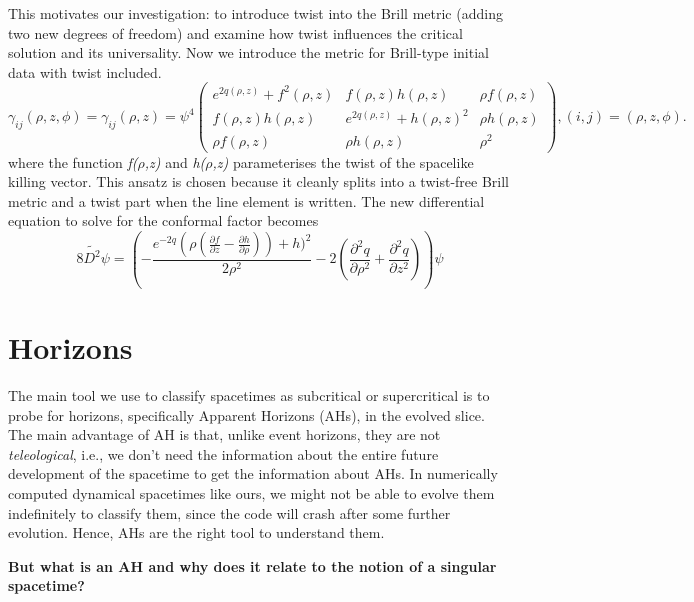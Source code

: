 This motivates our investigation: to introduce twist into the Brill metric (adding two new
degrees of freedom) and examine how twist influences the critical solution and its 
universality.
Now we introduce the metric for Brill-type initial data with twist included.
\begin{equation}
\gamma_{ij}(\rho,z,\phi) = \gamma_{ij}(\rho,z) = 
\psi ^4\begin{pmatrix}
    e^{2q(\rho,z)} + f^2(\rho,z) & f(\rho,z)h(\rho,z) & \rho f(\rho,z) \\
    f(\rho,z)h(\rho,z) & e^{2q(\rho,z)} + h(\rho,z)^2 & \rho h(\rho,z) \\
    \rho f(\rho,z) & \rho h(\rho,z) & \rho^{2}
\end{pmatrix},
(i,j) = (\rho, z, \phi).
\label{Twist-included}
\end{equation}
where the function \emph{f($\rho$,z)} and \emph{h($\rho$,z)} parameterises the twist of the spacelike killing vector. This ansatz is chosen because it cleanly splits into a twist-free Brill metric and a twist part when the line element is written. The new differential equation to solve for the conformal factor becomes 
\begin{equation}
8\tilde{D^2} \psi = \left(-\dfrac{e^{-2q}(\rho(\frac{\partial f}{\partial z} - {\frac{\partial h}{\partial \rho}}))+h)^2}{2 \rho^2}-2 \left(\dfrac{\partial^2 q}{\partial \rho^2}+ \dfrac{\partial^2 q}{\partial{z^2}}\right) \right) \psi
\label{eq:newconst}
\end{equation} 
\section{Horizons}

The main tool we use to classify spacetimes as subcritical or supercritical is to probe for horizons, specifically Apparent Horizons (AHs), in the evolved slice. The main advantage of AH is that, unlike event horizons, they are not \textit{teleological}, i.e., we don't need the information about the entire future development of the spacetime to get the information about AHs. In numerically computed dynamical spacetimes like ours, we might not be able to evolve them indefinitely to classify them, since the code will crash after some further evolution. Hence, AHs are the right tool to understand them.

\textbf{But what is an AH and why does it relate to the notion of a singular spacetime?}

